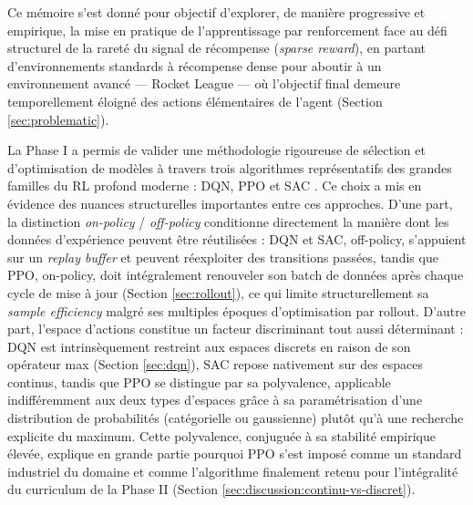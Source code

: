 Ce mémoire s'est donné pour objectif d'explorer, de manière progressive et empirique, la mise en pratique de l'apprentissage par renforcement face au défi structurel de la rareté du signal de récompense (\textit{sparse reward}), en partant d'environnements standards à récompense dense pour aboutir à un environnement avancé — Rocket League — où l'objectif final demeure temporellement éloigné des actions élémentaires de l'agent (Section \ref{sec:problematic}).

La Phase I a permis de valider une méthodologie rigoureuse de sélection et d'optimisation de modèles à travers trois algorithmes représentatifs des grandes familles du RL profond moderne : DQN, PPO et SAC \parencite{mnihHumanlevelControlDeep2015,schulmanProximalPolicyOptimization2017,haarnojaSoftActorCriticOffPolicy2018}. Ce choix a mis en évidence des nuances structurelles importantes entre ces approches. D'une part, la distinction \textit{on-policy} / \textit{off-policy} conditionne directement la manière dont les données d'expérience peuvent être réutilisées : DQN et SAC, off-policy, s'appuient sur un \textit{replay buffer} et peuvent réexploiter des transitions passées, tandis que PPO, on-policy, doit intégralement renouveler son batch de données après chaque cycle de mise à jour (Section \ref{sec:rollout}), ce qui limite structurellement sa \textit{sample efficiency} malgré ses multiples époques d'optimisation par rollout. D'autre part, l'espace d'actions constitue un facteur discriminant tout aussi déterminant : DQN est intrinsèquement restreint aux espaces discrets en raison de son opérateur max (Section \ref{sec:dqn}), SAC repose nativement sur des espaces continus, tandis que PPO se distingue par sa polyvalence, applicable indifféremment aux deux types d'espaces grâce à sa paramétrisation d'une distribution de probabilités (catégorielle ou gaussienne) plutôt qu'à une recherche explicite du maximum. Cette polyvalence, conjuguée à sa stabilité empirique élevée, explique en grande partie pourquoi PPO s'est imposé comme un standard industriel du domaine et comme l'algorithme finalement retenu pour l'intégralité du curriculum de la Phase II (Section \ref{sec:discussion:continu-vs-discret}).

